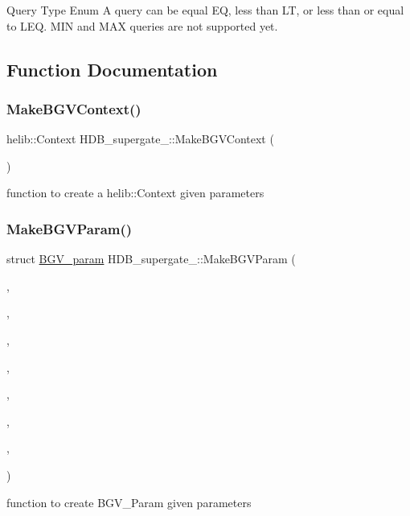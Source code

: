 Query Type Enum A query can be equal EQ, less than LT, or less than or equal to L\+EQ. M\+IN and M\+AX queries are not supported yet. 

\subsection{Function Documentation}
\mbox{\label{namespaceHDB__supergate___a8a0616d8c5b340d3ff4b663fa841fc51}} 
\subsubsection{\texorpdfstring{Make\+B\+G\+V\+Context()}{MakeBGVContext()}}
{\footnotesize\ttfamily helib\+::\+Context H\+D\+B\+\_\+supergate\+\_\+\+::\+Make\+B\+G\+V\+Context (\begin{DoxyParamCaption}\item[{const struct \hyperlink{structHDB__supergate___1_1BGV__param}{B\+G\+V\+\_\+param}}]{ }\end{DoxyParamCaption})}

function to create a helib\+::\+Context given parameters \mbox{\label{namespaceHDB__supergate___affa422b55e184c2fd69134364e309fbb}} 
\subsubsection{\texorpdfstring{Make\+B\+G\+V\+Param()}{MakeBGVParam()}}
{\footnotesize\ttfamily struct \hyperlink{structHDB__supergate___1_1BGV__param}{B\+G\+V\+\_\+param} H\+D\+B\+\_\+supergate\+\_\+\+::\+Make\+B\+G\+V\+Param (\begin{DoxyParamCaption}\item[{long}]{,  }\item[{long}]{,  }\item[{long}]{,  }\item[{long}]{,  }\item[{long}]{,  }\item[{long}]{,  }\item[{long}]{,  }\item[{long}]{ }\end{DoxyParamCaption})}

function to create B\+G\+V\+\_\+\+Param given parameters 